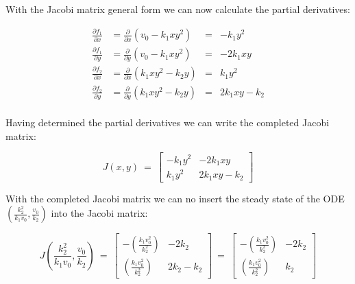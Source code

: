 \documentclass[]{scrartcl}
\begin{document}
\noindent With the Jacobi matrix general form we can now calculate the partial derivatives:

\begin{center}
\begin{align*}
	\frac{\partial f_1}{\partial x} &= \frac{\partial}{\partial x}(v_0 - k_1 x y^2) &= & -k_1 y^2 \\
	\frac{\partial f_1}{\partial y} &= \frac{\partial}{\partial y}(v_0 - k_1 x y^2) &= & -2 k_1 x y \\
	\frac{\partial f_2}{\partial x} &= \frac{\partial}{\partial x}(k_1 x y^2 - k_2 y)	&= & k_1 y^2 \\
	\frac{\partial f_2}{\partial y} &= \frac{\partial}{\partial y}(k_1 x y^2 - k_2 y)	&= & 2 k_1 x y - k_2 \\
\end{align*}
\end{center}

\noindent Having determined the partial derivatives we can write the completed Jacobi matrix:

\begin{center}
\[
J(x,y) ~=~
\begin{bmatrix}
  -k_1 y^2 & -2 k_1 x y \\[1ex] %
   k_1 y^2 & 2 k_1 x y - k_2
\end{bmatrix}
\]
\end{center}

\noindent With the completed Jacobi matrix we can no insert the steady state of the ODE $\left( \frac{k_2^2}{k_1 v_0} , \frac{v_0}{k_2} \right)$ into the Jacobi matrix:

\begin{center}
\[
J \left( \frac{k_2^2}{k_1 v_0} , \frac{v_0}{k_2} \right) ~=~
\begin{bmatrix}
  -\left( \frac{k_1 v_0^2}{k_2^2} \right) & -2 k_2 \\[1ex] %
   \left( \frac{k_1 v_0^2}{k_2^2} \right) & 2 k_2 - k_2
\end{bmatrix} ~=~
\begin{bmatrix}
  -\left( \frac{k_1 v_0^2}{k_2^2} \right) & -2 k_2 \\[1ex] %
   \left( \frac{k_1 v_0^2}{k_2^2} \right) & k_2
\end{bmatrix}
\]
\end{center}
\end{document}
